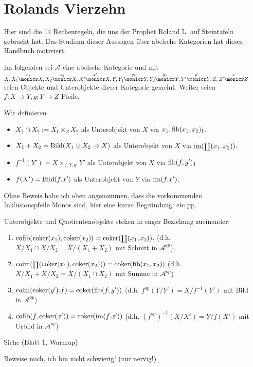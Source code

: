 \section{Rolands Vierzehn}

Hier sind die 14 Rechenregeln, die uns der Prophet Roland L. auf Steintafeln gebracht hat. Das Studium dieser Aussagen über abelsche Kategorien hat dieses Handbuch motiviert.

Im folgenden sei $\mathcal A$ eine abelsche Kategorie und mit $X,
X_1 \overset{x_1}\monicr X,
X_2 \overset{x_2}\monicr X,
X'  \overset{x'}\monicr X,
Y,
Y_1 \overset{y_1}\monicr Y,
Y_2 \overset{y_2}\monicr Y,
Y'  \overset{y'}\monicr Y,
Z,
Z'  \overset{z'}\monicr Z$
seien Objekte und Unterobjekte dieser Kategorie gemeint.
Weiter seien $f:X\to Y, g:Y\to Z$ Pfeile.

\begin{defn}[Objektnotation]
Wir definieren
\begin{itemize}
\item $X_1 \cap X_2 := X_1\times_Z X_2$ als Unterobjekt von $X$ via $x_1.\operatorname{fib}(x_1, x_2)_1$.
\item $X_1+X_2 = \operatorname{Bild}(X_1 \oplus X_2 \to X)$ als Unterobjekt von $X$ via $\operatorname{im}(\operatorname{\scriptstyle\coprod}(x_1,x_2))$.
\item $f^{-1}(Y') = X \times_{f,Y,y'} Y'$ als Unterobjekt von $X$ via $\operatorname{fib}(f,y')_1$
\item $f(X') = \operatorname{Bild}(f.x')$ als Unterobjekt von $Y$ via $\operatorname{im}(f.x')$.
\end{itemize}
\end{defn}

\begin{bem}
Ohne Beweis habe ich oben angenommen, dass die vorkommenden Inklusionspfeile Monos sind, hier eine kurze Begründung: etc.pp. %
\end{bem}

\begin{prop}[Reflexionsprinzip]
Unterobjekte und Quotientenobjekte stehen in enger Beziehung zueinander:
\begin{enumerate}
\item $\operatorname{cofib}(\operatorname{coker}(x_1), \operatorname{coker}(x_2)) = \operatorname{coker}(\operatorname{\scriptstyle\coprod}(x_1,x_2))$, (d.h. $X/X_1 \cap X/X_2 = X/(X_1+X_2)$ mit Schnitt in $\mathcal A^{op}$)
\item $\operatorname{coim}(\operatorname{\scriptstyle\prod}(\operatorname{coker}(x_1),\operatorname{coker}(x_2))) = \operatorname{coker}(\operatorname{fib}(x_1,x_2))$ (d.h. $X/X_1 + X/X_2 = X/(X_1\cap X_2)$ mit Summe in $\mathcal A^{op}$)
\item $\operatorname{coim}(\operatorname{coker}(y').f) = \operatorname{coker}(\operatorname{fib}(f,y'))$ (d.h. $f^{op}(Y/Y') = X/f^{-1}(Y')$ mit Bild in $\mathcal A^{op}$)
\item $\operatorname{cofib}(f,\operatorname{coker}(x')) = \operatorname{coker}(\operatorname{im}(f.x'))$ (d.h. $(f^{op})^{-1}(X/X') = Y/f(X')$ mit Urbild in $\mathcal A^{op}$)
\end{enumerate}
Siehe (Blatt 1, Warmup)
\end{prop}
\begin{bew}
Beweise mich, ich bin nicht schwierig! (nur nervig!)
\end{bew}


